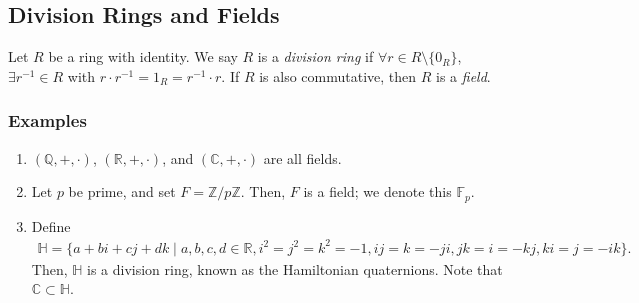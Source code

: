 \documentclass[8pt]{extarticle}
\newcommand{\Q}{\mathbb{Q}}
\newcommand{\Z}{\mathbb{Z}}
\newcommand{\R}{\mathbb{R}}
\begin{document}
  \subsection{Division Rings and Fields}%
  Let $R$ be a ring with identity. We say $R$ is a \textit{division ring} if $\forall r\in R\setminus \{0_R\}$, $\exists r^{-1}\in R$ with $r\cdot r^{-1} = 1_R = r^{-1}\cdot r$. If $R$ is also commutative, then $R$ is a \textit{field}.
  \subsubsection{Examples}%
  \begin{enumerate}[(1)]
    \item $(\Q,+,\cdot)$, $(\R,+,\cdot)$, and $(\mathbb{C},+,\cdot)$ are all fields.
    \item Let $p$ be prime, and set $F = \Z/p\Z$. Then, $F$ is a field; we denote this $\mathbb{F}_p$.
    \item Define 
      \begin{align*}
        \mathbb{H} = \{a+bi+cj+dk\mid a,b,c,d\in\R,i^2=j^2=k^2=-1,ij=k=-ji,jk=i=-kj,ki=j=-ik\}.
      \end{align*}
      Then, $\mathbb{H}$ is a division ring, known as the Hamiltonian quaternions. Note that $\mathbb{C}\subset \mathbb{H}$.
  \end{enumerate}
\end{document}
